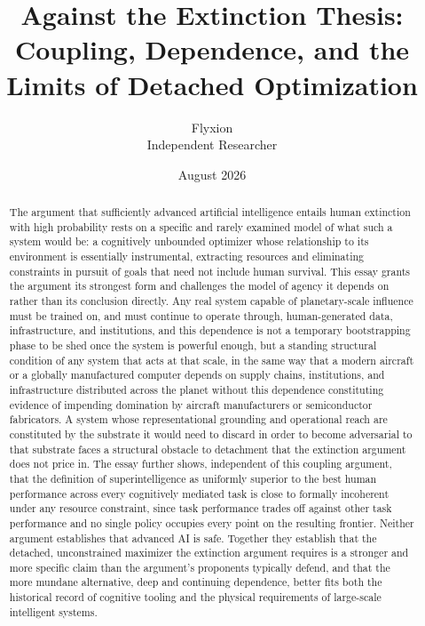 \documentclass[11pt]{article}
\title{Against the Extinction Thesis: \\ Coupling, Dependence, and the Limits of Detached Optimization}
\author{Flyxion \\ \small Independent Researcher}
\date{August 2026}
\begin{document}
\maketitle

\begin{abstract}
The argument that sufficiently advanced artificial intelligence entails human extinction with high probability rests on a specific and rarely examined model of what such a system would be: a cognitively unbounded optimizer whose relationship to its environment is essentially instrumental, extracting resources and eliminating constraints in pursuit of goals that need not include human survival. This essay grants the argument its strongest form and challenges the model of agency it depends on rather than its conclusion directly. Any real system capable of planetary-scale influence must be trained on, and must continue to operate through, human-generated data, infrastructure, and institutions, and this dependence is not a temporary bootstrapping phase to be shed once the system is powerful enough, but a standing structural condition of any system that acts at that scale, in the same way that a modern aircraft or a globally manufactured computer depends on supply chains, institutions, and infrastructure distributed across the planet without this dependence constituting evidence of impending domination by aircraft manufacturers or semiconductor fabricators. A system whose representational grounding and operational reach are constituted by the substrate it would need to discard in order to become adversarial to that substrate faces a structural obstacle to detachment that the extinction argument does not price in. The essay further shows, independent of this coupling argument, that the definition of superintelligence as uniformly superior to the best human performance across every cognitively mediated task is close to formally incoherent under any resource constraint, since task performance trades off against other task performance and no single policy occupies every point on the resulting frontier. Neither argument establishes that advanced AI is safe. Together they establish that the detached, unconstrained maximizer the extinction argument requires is a stronger and more specific claim than the argument's proponents typically defend, and that the more mundane alternative, deep and continuing dependence, better fits both the historical record of cognitive tooling and the physical requirements of large-scale intelligent systems.
\end{abstract}
\end{document}
